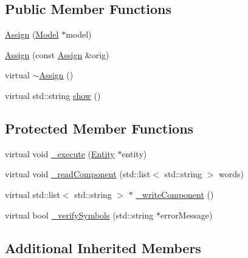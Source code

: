\subsection*{Public Member Functions}
\begin{DoxyCompactItemize}
\item 
\hyperlink{class_assign_afaa746a0ce157d4606823ad508dc6281}{Assign} (\hyperlink{class_model}{Model} $\ast$model)
\item 
\hyperlink{class_assign_ae4945adcf1b5dcdd3f57faa9dd85a2b0}{Assign} (const \hyperlink{class_assign}{Assign} \&orig)
\item 
virtual \hyperlink{class_assign_aa005626af06022d9101c5e38e794dc47}{$\sim$\-Assign} ()
\item 
virtual std\-::string \hyperlink{class_assign_af5022b92204adcd9ee3e444b7e316d07}{show} ()
\end{DoxyCompactItemize}
\subsection*{Protected Member Functions}
\begin{DoxyCompactItemize}
\item 
virtual void \hyperlink{class_assign_a5fabf69268b2e65d8b01ce247be87a40}{\-\_\-execute} (\hyperlink{class_entity}{Entity} $\ast$entity)
\item 
virtual void \hyperlink{class_assign_a47728ac75ef40025f00cca46e04dd012}{\-\_\-read\-Component} (std\-::list$<$ std\-::string $>$ words)
\item 
virtual std\-::list$<$ std\-::string $>$ $\ast$ \hyperlink{class_assign_a6231f1e819d6baab3c9af142fd5b566a}{\-\_\-write\-Component} ()
\item 
virtual bool \hyperlink{class_assign_a5f3a7d8a7214574fea926cae1b1acb94}{\-\_\-verify\-Symbols} (std\-::string $\ast$error\-Message)
\end{DoxyCompactItemize}
\subsection*{Additional Inherited Members}


